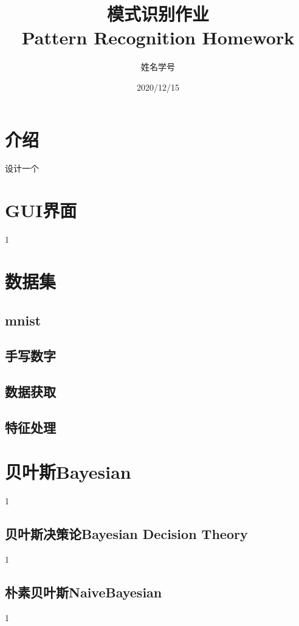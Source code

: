 \documentclass[UTF8, a4paper, 12pt]{report}
\title{模式识别作业\\Pattern Recognition Homework}
\author{姓名学号}
\date{2020/12/15}
\begin{document}
\maketitle %
\thispagestyle{empty} %
\clearpage %

\pagestyle{plain} %
\setcounter{page}{1} %
\tableofcontents %
\clearpage

\pagestyle{fancy} %
\setcounter{page}{1} %

\chapter{介绍}
设计一个
\chapter{GUI界面}
1
\chapter{数据集}
	\section{mnist}

	\section{手写数字}

	\section{数据获取}

	\section{特征处理}

\chapter{贝叶斯Bayesian}
1
	\section{贝叶斯决策论Bayesian Decision Theory}
1
	\section{朴素贝叶斯NaiveBayesian}
1
\end{document}
